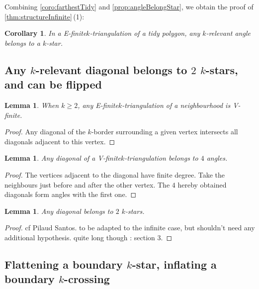 \documentclass{amsart}
\newtheorem{lemma}[theorem]{Lemma}
\newtheorem{corollary}[theorem]{Corollary}
\theoremstyle{remark}
\newcommand*{\nbd}[0]{neighbourhood\xspace}
\newcommand*{\ef}[0]{E-finite\xspace}
\newcommand*{\vf}[0]{V-finite\xspace}
\newcommand*{\ktg}[0]{$k$-triangulation\xspace}
\begin{document}
Combining \cref{coro:farthestTidy} and \cref{prop:angleBelongStar}, we obtain the proof of \cref{thm:structureInfinite}\,(1):

\begin{corollary}
In a \ef \ktg of a tidy polygon, any $k$-relevant angle belongs to a $k$-star.
\end{corollary}


\subsection{Any $k$-relevant diagonal belongs to $2$ $k$-stars, and can be flipped}

\begin{lemma}
When $k\geq 2$, any \ef \ktg of a \nbd is \vf.
\end{lemma}
\begin{proof}
Any diagonal of the $k$-border surrounding a given vertex intersects all diagonals adjacent to this vertex.
\end{proof}

\begin{lemma}
Any diagonal of a \vf \ktg belongs to $4$ angles.
\end{lemma}
\begin{proof}
The vertices adjacent to the diagonal have finite degree. Take the neighbours just before and after the other vertex. The $4$ hereby obtained diagonals form angles with the first one.
\end{proof}

\begin{lemma}
Any diagonal belongs to $2$ $k$-stars.
\end{lemma}
\begin{proof}
cf Pilaud Santos. to be adapted to the infinite case, but shouldn't need any additional hypothesis. quite long though : section 3.
\end{proof}


\subsection{Flattening a boundary $k$-star, inflating a boundary $k$-crossing}
\end{document}
